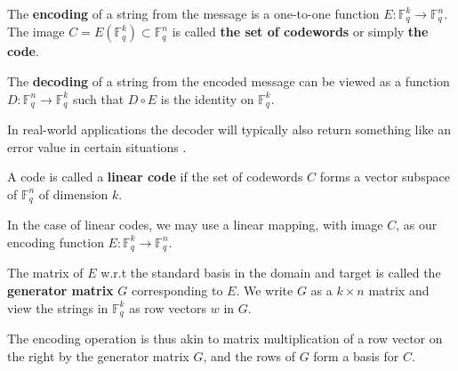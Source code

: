 \documentclass[english,bachelor]{liumaiex}
\begin{document}
\begin{define}
The \textbf{encoding} of a string from the message is a one-to-one function $E\colon\mathbb{F}_q^k\to\mathbb{F}_q^n$. The image $C=E\left(\mathbb{F}_q^k\right)\subset\mathbb{F}_q^n$ is called \textbf{the set of codewords} or simply \textbf{the code}.

\begin{define}
The \textbf{decoding} of a string from the encoded message can be viewed as a function $D\colon\mathbb{F}_q^n\to\mathbb{F}_q^k$ such that $D\circ E$ is the identity on $\mathbb{F}_q^k$.
\end{define}

\begin{rem}
In real-world applications the decoder will typically also return something like an error value in certain situations \cite[p. 460]{uag}.
\end{rem}

\begin{define}
A code is called a \textbf{linear code} if the set of codewords $C$ forms a vector subspace of $\mathbb{F}_q^n$ of dimension $k$.
\end{define}
In the case of linear codes, we may use a linear mapping, with image $C$, as our encoding function
$E\colon\mathbb{F}_q^k\to\mathbb{F}_q^n$.
\end{define}

\begin{define}
The matrix of $E$ w.r.t the standard basis in the domain and target is called the \textbf{generator matrix} $G$ corresponding to $E$. We write $G$ as a $k\times n$ matrix and view the strings in $\mathbb{F}_q^k$ as row vectors $w$ in $G$.
\end{define}
The encoding operation is thus akin to matrix multiplication of a row vector on the right by the generator matrix $G$, and the rows of $G$ form a basis for $C$.
\end{document}
